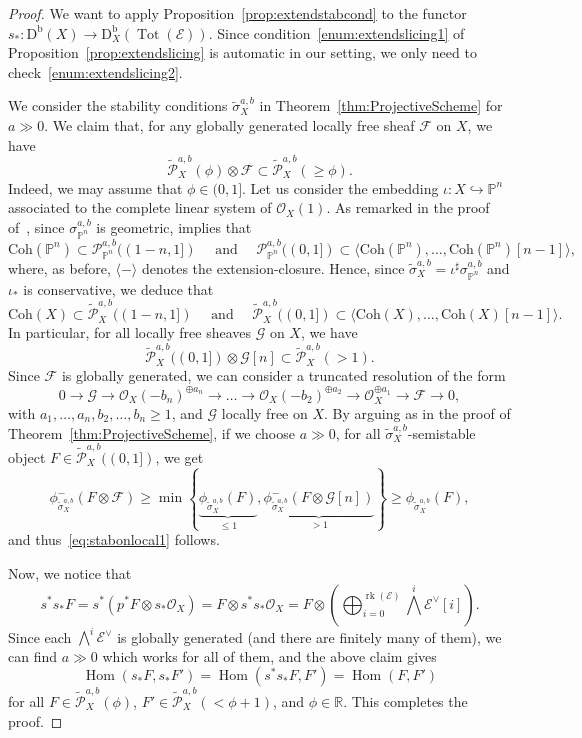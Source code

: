 \documentclass[11pt, reqno]{amsart}
\numberwithin{equation}{section}
\theoremstyle{plain}
\theoremstyle{remark}
\theoremstyle{definition}
\theoremstyle{italicsname}
\newcommand{\Db}{\mathrm{D^b}}
\newcommand{\Coh}{\mathrm{Coh}}
\DeclareMathOperator{\Hom}{Hom}
\DeclareMathOperator{\rk}{{rk}}
\newcommand{\cO}{\mathcal{O}}
\newcommand{\cE}{\mathcal{E}}
\newcommand{\cF}{\mathcal{F}}
\newcommand{\cG}{\mathcal{G}}
\newcommand{\cP}{\mathscr{P}}
\def\RR{\ensuremath{\mathbb{R}}}
\def\PP{\ensuremath{\mathbb{P}}}
\begin{document}
\begin{proof}
We want to apply Proposition~\ref{prop:extendstabcond} to the functor $s_*\colon\Db(X)\to \mathrm{D}_X^{\mathrm{b}}(\operatorname{Tot}(\cE))$.
Since condition~\ref{enum:extendslicing1} of Proposition~\ref{prop:extendslicing} is automatic in our setting, we only need to check~\ref{enum:extendslicing2}.

We consider the stability conditions $\widetilde{\sigma}^{a,b}_X$ in Theorem~\ref{thm:ProjectiveScheme} for $a\gg 0$.
We claim that, for any globally generated locally free sheaf $\cF$ on $X$, we have
\begin{equation}\label{eq:stabonlocal1}
\widetilde{\cP}^{a,b}_X(\phi)\otimes\cF\subset\widetilde{\cP}^{a,b}_X(\geq\phi).    
\end{equation}
Indeed, we may assume that $\phi\in(0,1]$.
Let us consider the embedding $\iota\colon X\hookrightarrow\PP^n$ associated to the complete linear system of $\cO_X(1)$.
As remarked in the proof of~\cite[Theorem 6.5]{chunyi-stability}, since $\sigma^{a,b}_{\PP^n}$ is geometric, \cite[Lemma 10.1]{Bridgeland:K3} implies that
\[
\Coh(\PP^n)\subset\cP^{a,b}_{\PP^n}((1-n, 1])\quad\text{ and }\quad \cP^{a,b}_{\PP^n}((0,1])\subset\langle\Coh(\PP^n),\dots,\Coh(\PP^n)[n-1]\rangle,
\]
where, as before, $\langle-\rangle$ denotes the extension-closure.
Hence, since $\widetilde{\sigma}^{a,b}_X=\iota^\sharp\sigma^{a,b}_{\PP^n}$ and $\iota_*$ is conservative, we deduce that
\[
\Coh(X)\subset\widetilde{\cP}^{a,b}_X((1-n, 1])\quad\text{ and }\quad \widetilde{\cP}^{a,b}_{X}((0,1])\subset\langle\Coh(X),\dots,\Coh(X)[n-1]\rangle.
\]
In particular, for all locally free sheaves $\cG$ on $X$, we have
\[
\widetilde{\cP}^{a,b}_X((0,1])\otimes\cG[n]\subset\widetilde{\cP}^{a,b}_X(>1).
\]
Since $\cF$ is globally generated, we can consider a truncated resolution of the form
\[
0\longrightarrow \cG\longrightarrow\cO_X(-b_n)^{\oplus a_n}\longrightarrow\dots\longrightarrow\cO_X(-b_2)^{\oplus a_2}\longrightarrow\cO_X^{\oplus a_1}\longrightarrow\cF\longrightarrow 0,
\]
with $a_1,\dots,a_n,b_2,\dots,b_n\geq1$, and $\cG$ locally free on $X$.
By arguing as in the proof of Theorem~\ref{thm:ProjectiveScheme}, if we choose $a\gg 0$, for all $\widetilde{\sigma}^{a,b}_X$-semistable object $F\in\widetilde{\cP}^{a,b}_X((0,1])$, we get
\[
\phi_{\widetilde{\sigma}^{a,b}_X}^-(F\otimes\cF)\geq\min\left\{\underbrace{\phi^{\phantom{-}}_{\widetilde{\sigma}^{a,b}_X}(F)}_{\leq 1},\underbrace{\phi^-_{\widetilde{\sigma}^{a,b}_X}(F\otimes\cG[n])}_{>1}\right\}\geq\phi^{\phantom{-}}_{\widetilde{\sigma}^{a,b}_X}(F),
\]
and thus~\eqref{eq:stabonlocal1} follows.

Now, we notice that 
\[
s^*s_*F=s^*(p^*F\otimes s_*\cO_X)=F\otimes s^*s_*\cO_X=F\otimes\left(\bigoplus_{i=0}^{\rk(\cE)} \bigwedge^i\cE^\vee[i]\right).
\]
Since each $\bigwedge^i\cE^\vee$ is globally generated (and there are finitely many of them), we can find $a\gg0$ which works for all of them, and the above claim gives 
\[
\Hom(s_*F,s_*F')=\Hom(s^*s_*F, F')=\Hom(F,F')
\]
for all $F\in\widetilde{\cP}_X^{a,b}(\phi)$, $F'\in \widetilde{\cP}_X^{a,b}\left(<\phi+1\right)$, and $\phi\in\RR$. 
This completes the proof.
\end{proof}
\end{document}
